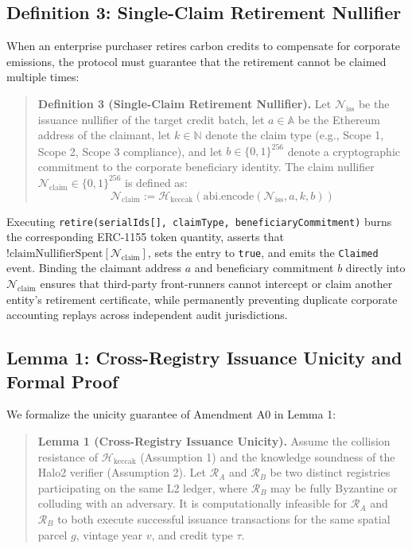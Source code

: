\documentclass[preprint,12pt]{elsarticle}
\begin{document}
\subsection{Definition 3: Single-Claim Retirement Nullifier}

When an enterprise purchaser retires carbon credits to compensate for corporate emissions, the protocol must guarantee that the retirement cannot be claimed multiple times:

\begin{quote}
\textbf{Definition 3 (Single-Claim Retirement Nullifier).} Let $\mathcal{N}_{\text{iss}}$ be the issuance nullifier of the target credit batch, let $a \in \mathbb{A}$ be the Ethereum address of the claimant, let $k \in \mathbb{N}$ denote the claim type (e.g., Scope 1, Scope 2, Scope 3 compliance), and let $b \in \{0,1\}^{256}$ denote a cryptographic commitment to the corporate beneficiary identity. The claim nullifier $\mathcal{N}_{\text{claim}} \in \{0,1\}^{256}$ is defined as:
$$\mathcal{N}_{\text{claim}} := \mathcal{H}_{\text{keccak}}(\text{abi.encode}(\mathcal{N}_{\text{iss}}, a, k, b))$$
\end{quote}

Executing \texttt{retire(serialIds[], claimType, beneficiaryCommitment)} burns the corresponding ERC-1155 token quantity, asserts that $!\text{claimNullifierSpent}[\mathcal{N}_{\text{claim}}]$, sets the entry to \texttt{true}, and emits the \texttt{Claimed} event. Binding the claimant address $a$ and beneficiary commitment $b$ directly into $\mathcal{N}_{\text{claim}}$ ensures that third-party front-runners cannot intercept or claim another entity's retirement certificate, while permanently preventing duplicate corporate accounting replays across independent audit jurisdictions.

\subsection{Lemma 1: Cross-Registry Issuance Unicity and Formal Proof}

We formalize the unicity guarantee of Amendment A0 in Lemma 1:

\begin{quote}
\textbf{Lemma 1 (Cross-Registry Issuance Unicity).} Assume the collision resistance of $\mathcal{H}_{\text{keccak}}$ (Assumption 1) and the knowledge soundness of the Halo2 verifier (Assumption 2). Let $\mathcal{R}_A$ and $\mathcal{R}_B$ be two distinct registries participating on the same L2 ledger, where $\mathcal{R}_B$ may be fully Byzantine or colluding with an adversary. It is computationally infeasible for $\mathcal{R}_A$ and $\mathcal{R}_B$ to both execute successful issuance transactions for the same spatial parcel $g$, vintage year $v$, and credit type $\tau$.
\end{quote}
\end{document}
